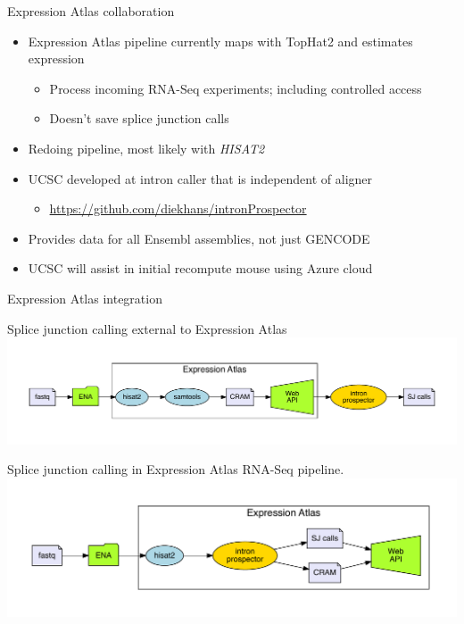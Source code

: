 \documentclass[10pt,
               hyperref={bookmarks=false,
                         bookmarksopen=false,
                         colorlinks=true,
                         linkcolor=blue,
                         urlcolor=blue},
               xcolor={svgnames,table}]{beamer}
\newenvironment{tightitemize}{%
\begin{itemize}
  \setlength{\itemsep}{1pt}%
  \setlength{\parskip}{0pt}%
  \setlength{\parsep}{0pt}%
}{\end{itemize}}
\begin{document}
\begin{frame}{Expression Atlas collaboration}
  \begin{itemize}
  \item Expression Atlas pipeline currently maps with TopHat2 and estimates expression
    \begin{tightitemize}
    \item Process incoming RNA-Seq experiments; including controlled access
    \item Doesn't save splice junction calls
    \end{tightitemize}
  \item Redoing pipeline, most likely with {\em HISAT2}
  \item UCSC developed at intron caller that is independent of aligner
    \begin{tightitemize}
    \item \url{https://github.com/diekhans/intronProspector}
    \end{tightitemize}
  \item Provides data for all Ensembl assemblies, not just GENCODE
  \item UCSC will assist in initial recompute mouse using Azure cloud
  \end{itemize}
\end{frame}

\begin{frame}{Expression Atlas integration}
  \begin{center}
    Splice junction calling external to Expression Atlas
    \includegraphics[scale=0.42]{images/calling_external.pdf}

    Splice junction calling in Expression Atlas RNA-Seq pipeline.
    \includegraphics[scale=0.42]{images/calling_at_expression_atlas.pdf}
  \end{center}
\end{frame}
\end{document}

